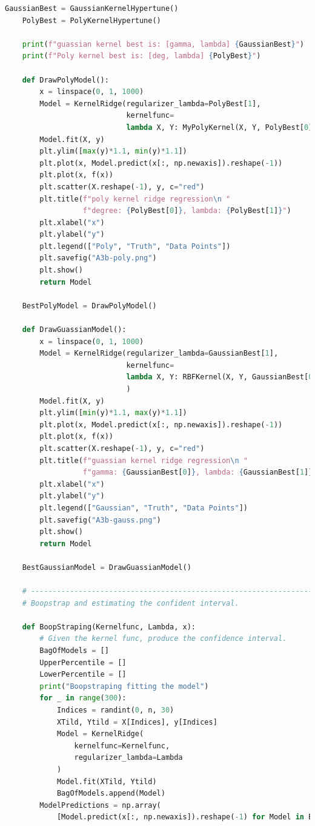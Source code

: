 \documentclass[]{article}
\begin{document}
\begin{lstlisting}[language=python]
    GaussianBest = GaussianKernelHypertune()
    PolyBest = PolyKernelHypertune()

    print(f"guassian kernel best is: [gamma, lambda] {GaussianBest}")
    print(f"Poly kernel best is: [deg, lambda] {PolyBest}")

    def DrawPolyModel():
        x = linspace(0, 1, 1000)
        Model = KernelRidge(regularizer_lambda=PolyBest[1],
                            kernelfunc=
                            lambda X, Y: MyPolyKernel(X, Y, PolyBest[0]))
        Model.fit(X, y)
        plt.ylim([max(y)*1.1, min(y)*1.1])
        plt.plot(x, Model.predict(x[:, np.newaxis]).reshape(-1))
        plt.plot(x, f(x))
        plt.scatter(X.reshape(-1), y, c="red")
        plt.title(f"poly kernel ridge regression\n "
                  f"degree: {PolyBest[0]}, lambda: {PolyBest[1]}")
        plt.xlabel("x")
        plt.ylabel("y")
        plt.legend(["Poly", "Truth", "Data Points"])
        plt.savefig("A3b-poly.png")
        plt.show()
        return Model

    BestPolyModel = DrawPolyModel()

    def DrawGuassianModel():
        x = linspace(0, 1, 1000)
        Model = KernelRidge(regularizer_lambda=GaussianBest[1],
                            kernelfunc=
                            lambda X, Y: RBFKernel(X, Y, GaussianBest[0])
                            )
        Model.fit(X, y)
        plt.ylim([min(y)*1.1, max(y)*1.1])
        plt.plot(x, Model.predict(x[:, np.newaxis]).reshape(-1))
        plt.plot(x, f(x))
        plt.scatter(X.reshape(-1), y, c="red")
        plt.title(f"guassian kernel ridge regression\n "
                  f"gamma: {GaussianBest[0]}, lambda: {GaussianBest[1]}")
        plt.xlabel("x")
        plt.ylabel("y")
        plt.legend(["Gaussian", "Truth", "Data Points"])
        plt.savefig("A3b-gauss.png")
        plt.show()
        return Model

    BestGaussianModel = DrawGuassianModel()

    # --------------------------------------------------------------------------
    # Boopstrap and estimating the confident interval.

    def BoopStraping(Kernelfunc, Lambda, x):
        # Given the kernel func, produce the confidence interval.
        BagOfModels = []
        UpperPercentile = []
        LowerPercentile = []
        print("Boopstraping fitting the model")
        for _ in range(300):
            Indices = randint(0, n, 30)
            XTild, Ytild = X[Indices], y[Indices]
            Model = KernelRidge(
                kernelfunc=Kernelfunc,
                regularizer_lambda=Lambda
            )
            Model.fit(XTild, Ytild)
            BagOfModels.append(Model)
        ModelPredictions = np.array(
            [Model.predict(x[:, np.newaxis]).reshape(-1) for Model in BagOfModels])


\end{lstlisting}
\end{document}
